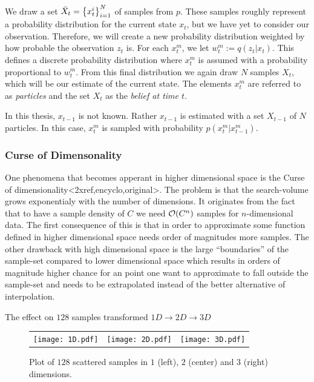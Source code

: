 We draw a set $\bar{X}_t = \left\{x_{t}^{i}\right\}_{i=1}^{N}$ of samples from $p$. These samples roughly represent a probability distribution for the current state $x_t$, but we have yet to consider our observation. Therefore, we will create a new probability distribution weighted by how probable the observation $z_t$ is. For each $x_t^m$, we let $w_t^m := q\left(z_t | x_t\right)$. This defines a discrete probability distribution where $x_t^m$ is assumed with a probability proportional to $w_t^m$. From this final distribution we again draw $N$ samples $X_t$, which will be our estimate of the current state. The elements $x_t^m$ are referred to as \emph{particles} and the set $X_t$ as the \emph{belief at time $t$}.

In this thesis, $x_{t-1}$ is not known. Rather $x_{t-1}$ is estimated with a set $X_{t-1}$ of $N$ particles. In this case, $x_t^m$ is sampled with probability $p\left(x_t^m | x_{t-1}^m\right)$.

\subsubsection{Curse of Dimensonality}
One phenomena that becomes apperant in higher dimensional space is the Curse of dimensionality<2xref,encyclo,original>.
The problem is that the search-volume grows exponentialy with
the number of dimensions. It originates from the fact that to have 
a sample density of $C$ we need $\mathcal{O}{\left(C^n\right)}$ samples for $n$-dimensional data.
The first consequence of this is that in order to approximate some
function defined in higher dimensional space needs order of magnitudes more samples.
The other drawback with high dimensional space is the large ``boundaries'' 
of the sample-set compared to lower dimensional space which results in orders of
magnitude higher chance for an point one want to approximate to fall outside
the sample-set and needs to be extrapolated instead of the better alternative of interpolation.

\begin{example}
The effect on $128$ samples transformed $1D\rightarrow2D\rightarrow3D$
\begin{figure}
    \begin{tabular}{rcl}
        \texttt{[image: 1D.pdf]}&
        \texttt{[image: 2D.pdf]}&
        \texttt{[image: 3D.pdf]}
    \end{tabular}
    \caption{Plot of $128$ scattered samples in $1$ (left), $2$ (center) and $3$ (right) dimensions.}
\end{figure}
\end{example}

